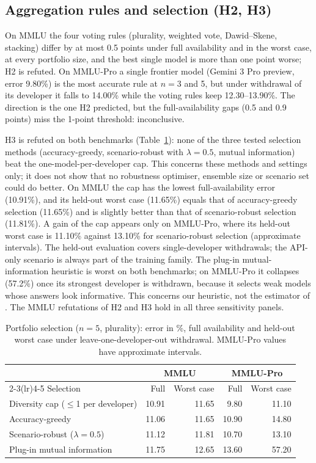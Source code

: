 \documentclass[preprint,12pt,authoryear]{elsarticle}
\begin{document}
\subsection{Aggregation rules and selection (H2, H3)}
On MMLU the four voting rules (plurality, weighted vote, Dawid--Skene, stacking) differ by at most 0.5 points under full availability and in the worst case, at every portfolio size, and the best single model is more than one point worse; H2 is refuted. On MMLU-Pro a single frontier model (Gemini 3 Pro preview, error 9.80\%) is the most accurate rule at $n=3$ and 5, but under withdrawal of its developer it falls to 14.00\% while the voting rules keep 12.30--13.90\%. The direction is the one H2 predicted, but the full-availability gaps (0.5 and 0.9 points) miss the 1-point threshold: inconclusive.

H3 is refuted on both benchmarks (Table~\ref{tab:h3}): none of the three tested selection methods (accuracy-greedy, scenario-robust with $\lambda = 0.5$, mutual information) beat the one-model-per-developer cap. This concerns these methods and settings only; it does not show that no robustness optimiser, ensemble size or scenario set could do better. On MMLU the cap has the lowest full-availability error (10.91\%), and its held-out worst case (11.65\%) equals that of accuracy-greedy selection (11.65\%) and is slightly better than that of scenario-robust selection (11.81\%). A gain of the cap appears only on MMLU-Pro, where its held-out worst case is 11.10\% against 13.10\% for scenario-robust selection (approximate intervals). The held-out evaluation covers single-developer withdrawals; the API-only scenario is always part of the training family. The plug-in mutual-information heuristic is worst on both benchmarks; on MMLU-Pro it collapses (57.2\%) once its strongest developer is withdrawn, because it selects weak models whose answers look informative. This concerns our heuristic, not the estimator of \citet{turkmen2026}. The MMLU refutations of H2 and H3 hold in all three sensitivity panels.

\begin{table}[!htbp]
\centering
\caption{Portfolio selection ($n=5$, plurality): error in \%, full availability and held-out worst case under leave-one-developer-out withdrawal. MMLU-Pro values have approximate intervals.}
\label{tab:h3}
\small
\begin{tabular}{@{}lrrrr@{}}
\toprule
& \multicolumn{2}{c}{MMLU} & \multicolumn{2}{c}{MMLU-Pro} \\
\cmidrule(lr){2-3}\cmidrule(lr){4-5}
Selection & Full & Worst case & Full & Worst case \\
\midrule
Diversity cap ($\le$1 per developer) & 10.91 & 11.65 & 9.80 & 11.10 \\
Accuracy-greedy & 11.06 & 11.65 & 10.90 & 14.80 \\
Scenario-robust ($\lambda=0.5$) & 11.12 & 11.81 & 10.70 & 13.10 \\
Plug-in mutual information & 11.75 & 12.65 & 13.60 & 57.20 \\
\bottomrule
\end{tabular}
\end{table}
\end{document}
